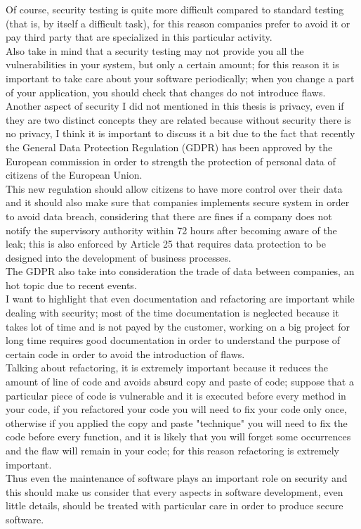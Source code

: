 Of course, security testing is quite more difficult compared to standard testing (that is, by itself a difficult task), for this reason companies prefer to avoid it or pay third party that are specialized in this particular activity.\\
Also take in mind that a security testing may not provide you all the vulnerabilities in your system, but only a certain amount; for this reason it
is important to take care about your software periodically; when you change a part of your application, you should check that changes do not
introduce flaws.\\

Another aspect of security I did not mentioned in this thesis is privacy, even if they are two distinct concepts they are related because without security there is no privacy, I think it is important to discuss it a bit due to the fact that recently the General Data Protection Regulation (GDPR)
has been approved by the European commission in order to strength the protection of personal data of citizens of the European Union.\\
This new regulation should allow citizens to have more control over their data and it should also make sure that companies implements secure system
in order to avoid data breach, considering that there are fines if a company does not notify the supervisory authority within 72 hours after becoming aware of the leak; this is also enforced by Article 25 that requires data protection to be designed into the development of business processes\cite{wikica}.\\
The GDPR also take into consideration the trade of data between companies, an hot topic due to recent events\cite{ca}.\\


I want to highlight that even documentation and refactoring are important while dealing with security; most of the time documentation is neglected because it takes lot of time and is not payed by the customer, working on a big project for long time
requires good documentation in order to understand the purpose of certain code in order to avoid the introduction of flaws.\\
Talking about refactoring, it is extremely important because it reduces the amount of line of code and
avoids absurd copy and paste of code; suppose that a particular piece of code is vulnerable and it is executed
before every method in your code, if you refactored your code you will need to fix your code only once, otherwise
if you applied the copy and paste "technique" you will need to fix the code before every function, and it is likely that you will forget some occurrences and the flaw will remain in your code; for this reason refactoring is extremely important.\\
Thus even the maintenance of software plays an important role on security and this should make us consider that every
aspects in software development, even little details, should be treated with particular care in order to produce secure software.